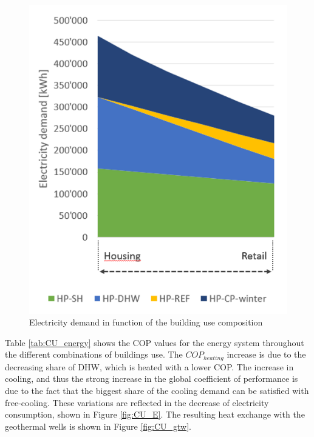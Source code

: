\documentclass{article}
\begin{document}
\begin{figure}[tph]
	\centering
	\includegraphics[width=0.55\linewidth]{Images/CU_el}
	\caption{Electricity demand in function of the building use composition}
	\label{fig:CU_el}
\end{figure}

Table \ref{tab:CU_energy} shows the COP values for the energy system throughout the different combinations of buildings use. The $COP_{heating}$ increase is due to the decreasing share of DHW, which is heated with a lower COP. The increase in cooling, and thus the strong increase in the global coefficient of performance is due to the fact that the biggest share of the cooling demand can be satisfied with free-cooling. These variations are reflected in the decrease of electricity consumption, shown in Figure \ref{fig:CU_E}. The resulting heat exchange with the geothermal wells is shown in Figure \ref{fig:CU_gtw}.


\end{document}
